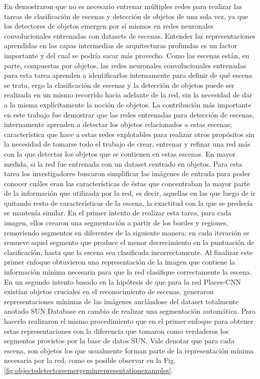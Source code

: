 En \cite{object_detectors_emerge_in_deep_scene_cnns} demostraron que no es necesario entrenar múltiples redes para realizar las tareas de clasificación de escenas y detección de objetos de una sola vez, ya que los detectores de objetos emergen por sí mismos en redes neuronales convolucionales entrenadas con datasets de escenas. 
Entender las representaciones aprendidas en las capas intermedias de arquitecturas profundas es un factor importante y del cual se podría sacar más provecho. Como las escenas están, en parte, compuestas por objetos, las redes neuronales convolucionales entrenadas para esta tarea aprenden a identificarlos internamente para definir de qué escena se trata, ergo la clasificación de escenas y la detección de objetos puede ser realizada en un mismo recorrido hacia adelante de la red, sin la necesidad de dar a la misma explícitamente la noción de objetos.
La contribución más importante en este trabajo fue demostrar que las redes entrenadas para detección de escenas, internamente aprenden a detectar los objetos relacionados a estas escenas; característica que hace a estas redes explotables para realizar otros propósitos sin la necesidad de tomarse todo el trabajo de crear, entrenar y refinar una red más con la que detectar los objetos que se contienen en estas escenas. En mayor medida, si la red fue entrenada con un dataset centrado en objetos. 
Para esta tarea los investigadores buscaron simplificar las imágenes de entrada para poder conocer cuáles eran las características de éstas que concentraban la mayor parte de la información que utilizada por la red, es decir, aquellas en las que luego de ir quitando resto de características de la escena, la exactitud con la que se predecía se mantenía similar. En el primer intento de realizar esta tarea, para cada imagen, ellos crearon una segmentación a partir de los bordes y regiones, removiendo segmentos en diferentes de la siguiente manera: en cada iteración se remueve aquel segmento que produce el menor decrecimiento en la puntuación de clasificación, hasta que la escena sea clasificada incorrectamente. Al finalizar este primer enfoque obtuvieron una representación de la imagen que contiene la información mínima necesaria para que la red clasifique correctamente la escena. 
En un segundo intento basado en la hipótesis de que para la red Places-CNN existían objetos cruciales en el reconocimiento de escenas, generaron representaciones mínimas de las imágenes anclándose del dataset totalmente anotado SUN Database en cambio de realizar una segmentación automática. Para hacerlo realizaron el mismo procedimiento que en el primer enfoque para obtener estas representaciones con la diferencia que tomaron como verdaderos los segmentos provistos por la base de datos SUN. Vale denotar que para cada escena, son objetos los que usualmente forman parte de la representación mínima necesaria por la red, como es posible observar en la Fig. \ref{fig:objectsdetectorsemergeminrepresentationexamples}.
